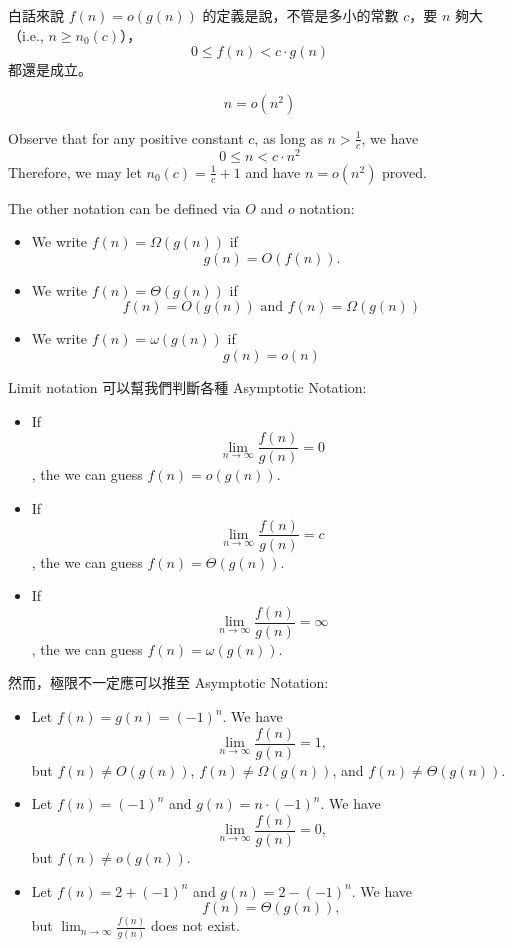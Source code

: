 \vspace{1em}

白話來說 $f(n) = o(g(n))$ 的定義是說，不管是多小的常數 $c$，要 $n$ 夠大（i.e., $n \geq n_0(c)$），
\[
0 \leq f(n) < c \cdot g(n)
\]
都還是成立。

\begin{eg}
$$n = o(n^2)$$
\end{eg}
\vspace{0.5em}
Observe that for any positive constant $c$, as long as $n > \frac{1}{c}$, we have 
\[
0 \leq n < c\cdot n^2
\]
Therefore, we may let $n_0(c) = \frac{1}{c} + 1$ and have $n = o(n^2)$ proved.

\begin{definition}
    The other notation can be defined via $O$ and $o$ notation:
    \begin{itemize}
        \item We write $f(n) = \Omega(g(n))$ if \[
            g(n) = O(f(n)).
        \]
        \item We write $f(n) = \Theta(g(n))$ if \[
            f(n) = O(g(n)) \text{ and } f(n) = \Omega(g(n))
        \]
        \item We write $f(n) = \omega(g(n))$ if \[
            g(n) = o(n)
        \]
    \end{itemize}
\end{definition}


Limit notation 可以幫我們判斷各種 Asymptotic Notation:
\begin{itemize}
    \item If \[
        \lim_{n \rightarrow \infty} \frac{f(n)}{g(n)} = 0
    \], the we can guess $f(n) = o(g(n))$.
    \item If \[
        \lim_{n \rightarrow \infty} \frac{f(n)}{g(n)} = c
    \], the we can guess $f(n) = \Theta(g(n))$.
    \item If \[
        \lim_{n \rightarrow \infty} \frac{f(n)}{g(n)} = \infty
    \], the we can guess $f(n) = \omega(g(n))$.
\end{itemize}
\vspace{1em}

然而，極限不一定應可以推至 Asymptotic Notation:
\begin{itemize}
    \item Let $f(n) = g(n) = (-1)^n$. We have \[
        \lim_{n \rightarrow \infty} \frac{f(n)}{g(n)} = 1,
    \] but $f(n) \neq O(g(n))$, $f(n) \neq \Omega(g(n))$, and $f(n) \neq \Theta(g(n))$.
    \item Let $f(n) = (-1)^n$ and $g(n) = n \cdot (-1)^n$. We have \[
        \lim_{n \rightarrow \infty} \frac{f(n)}{g(n)} = 0,
    \] but $f(n) \neq o(g(n))$.
    \item Let $f(n) = 2 + (-1)^n$ and $g(n) = 2-(-1)^n$. We have \[
        f(n) = \Theta(g(n)),
    \] but $\lim_{n\rightarrow \infty} \frac{f(n)}{g(n)}$ does not exist.
\end{itemize}

